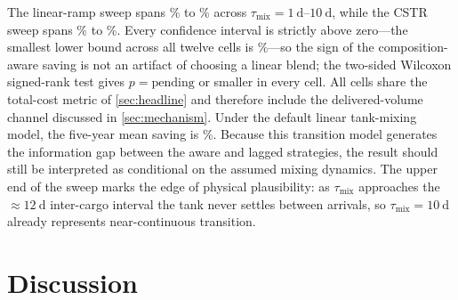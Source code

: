 \documentclass[11pt]{article}
\providecommand{\lngMixingWilcoxonMaxP}{p=\text{pending}}
\begin{document}
The linear-ramp sweep spans \lngMixingLinearMinPct\% to
\lngMixingLinearMaxPct\% across $\tau_{\text{mix}}=\SIrange{1}{10}{\day}$,
while the CSTR sweep spans \lngMixingCstrMinPct\% to \lngMixingCstrMaxPct\%.
Every confidence interval is strictly above zero---the smallest lower bound
across all twelve cells is \lngMixingMinCiLoPct\%---so the sign of the
composition-aware saving is not an artifact of choosing a linear blend; the
two-sided Wilcoxon signed-rank test gives $\lngMixingWilcoxonMaxP$ or smaller
in every cell. All cells share the total-cost metric of \cref{sec:headline}
and therefore include the delivered-volume channel discussed in
\cref{sec:mechanism}. Under the default linear tank-mixing model, the
five-year mean saving is \lngHeadlineSavingVsLaggedPct\%. Because this
transition model generates the information gap between
the aware and lagged strategies, the result should still be interpreted as
conditional on the assumed mixing dynamics. The upper end of the sweep marks
the edge of physical plausibility: as $\tau_{\text{mix}}$ approaches the
$\approx\SI{12}{\day}$ inter-cargo interval the tank never settles between
arrivals, so $\tau_{\text{mix}}=\SI{10}{\day}$ already represents
near-continuous transition.

\begin{table}[h]
  \centering
  \caption{Five-year-mean composition-aware saving versus the lagged baseline
    at \SI{80}{\EUR\per\tCOtwo}, as a function of the tank-mixing timescale
    $\tau_{\text{mix}}$ for the default linear-ramp kernel (bold row: default
    $\tau_{\text{mix}}=\SI{5}{\day}$) and a first-order CSTR kernel. Each cell
    reports the mean saving with a $95\%$ Student's $t$ interval; the $n$
    columns report the aggregation count of the generating artifact
    (seed-first means after the corrected rerun). The tabular is generated
    from \texttt{results/tables/mixing\_table3.csv} by
    \texttt{scripts/09\_paper\_numbers.py}.}
  \label{tab:mixing-sensitivity}
\end{table}

\FloatBarrier  %

\section{Discussion}
\label{sec:discussion}
\end{document}
